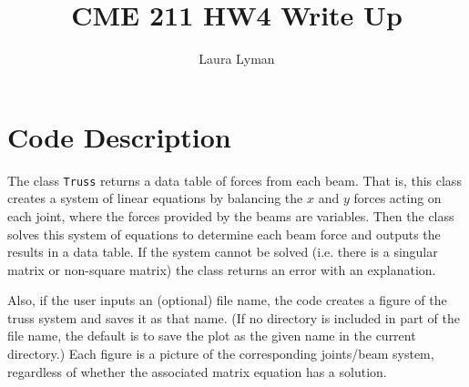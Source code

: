 \documentclass[11pt]{amsart}
\theoremstyle{definition}
\begin{document}
\title{CME 211 HW4 Write Up}
\author{Laura Lyman}

\maketitle
\tableofcontents
\section{Code Description} The class \texttt{Truss} returns a data table of forces from each beam. That is, this class creates a system of linear equations by balancing the $x$ and $y$ forces acting on each joint, where the forces provided
by the beams are variables. Then the class solves this system of equations to determine each beam force and outputs the results in a data table. If the system cannot be solved (i.e. there is a singular matrix or non-square matrix) the class returns an error with an explanation.

Also, if the user inputs an (optional) file name, the code creates a figure of the truss system and saves it as that name. (If no directory is included in part of the file name, the default is to save the plot as the given name in the current directory.) Each figure is a picture of the corresponding joints/beam system, regardless of whether the associated matrix equation has a solution.
\end{document}
